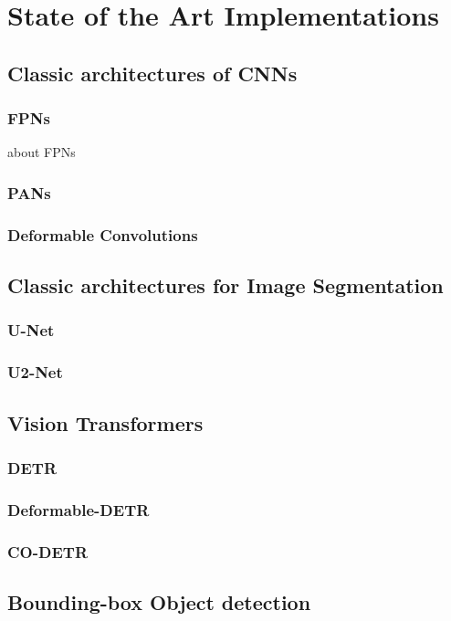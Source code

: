 \documentclass{report} %
\begin{document}
\part{State of the Art Implementations}

\chapter{Classic architectures of CNNs}
\section{FPNs}
about FPNs
\section{PANs}
\section{Deformable Convolutions}

\chapter{Classic architectures for Image Segmentation}
\section{U-Net}
\section{U2-Net}

\chapter{Vision Transformers}
\section{DETR}
\section{Deformable-DETR}
\section{CO-DETR}

\chapter{Bounding-box Object detection}
\end{document}
